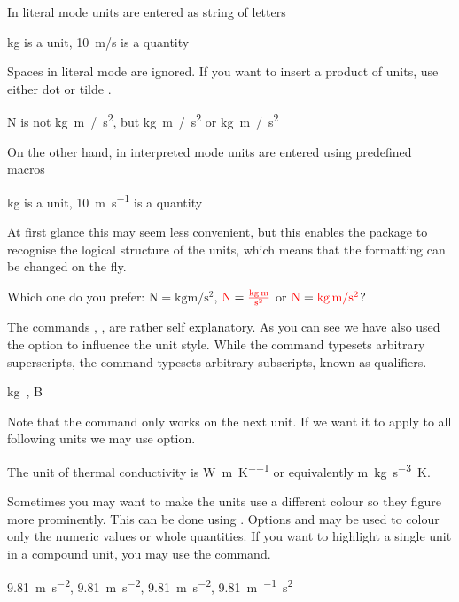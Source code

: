 In literal mode units are entered as string of letters
\begin{example}
\unit{kg} is a unit,
\qty{10}{m/s} is a quantity
\end{example}
Spaces in literal mode are ignored. If you want to insert a product of units,
use either dot  or tilde \ai{\~{}}.
\begin{example}
\unit{N} is 
not \unit{kg m / s^2},
but \unit{kg.m / s^2}
or \unit{kg~m / s^2}
\end{example}

On the other hand, in interpreted mode units are entered using predefined
macros
\begin{example}
\unit{\kilo\gram} is a unit,
\qty{10}{\metre\per\second}
is a quantity
\end{example}
At first glance this may seem less convenient, but this enables the package to
recognise the logical structure of the units, which means that the formatting
can be changed on the fly.
\begin{example}[examplewidth=0.8\linewidth, vertical_mode]
Which one do you prefer:
$\unit{\newton} = \unit{
  \kilo\gram\metre\per\square\second}$,
$\unit{\newton} = \unit[per-mode = fraction]{
  \kilo\gram\metre\per\second\squared}$ or
$\unit{\N} = \unit[per-mode = symbol]{
  \kg\m\per\s\tothe{2}}$?
\end{example}
The commands , ,  are rather self explanatory. As you
can see we have also used the  option to influence the unit
style. While the command  typesets arbitrary superscripts, the
command  typesets arbitrary subscripts, known as qualifiers.
\begin{example}[examplewidth=0.35\linewidth]
\unit{\kg{}}, \unit{\bel{}}
\end{example}

Note that the  command only works on the next unit. If we want it to
apply to all following units we may use  option.
\begin{example}[examplewidth=0.35\linewidth]
The unit of thermal conductivity is
\unit{\watt\per\metre\per\kelvin}
or equivalently
\unit[sticky-per]{\m\kg\per\s\cubed\K}. 
\end{example}

Sometimes you may want to make the units use a different colour so they figure more prominently. This can be done using . Options
 and  may be used to colour only the numeric
values or whole quantities. If you want to highlight a single unit in a
compound unit, you may use the  command.
\begin{example}[examplewidth=0.8\linewidth, vertical_mode]
\qty[unit-color = red   ]{9.81}{\m\per\s\squared},
\qty[number-color = blue]{9.81}{\m\per\s\squared},
\qty[color = green      ]{9.81}{\m\per\s\squared},
\qty{9.81}{\m\per{}\s\squared}
\end{example}


